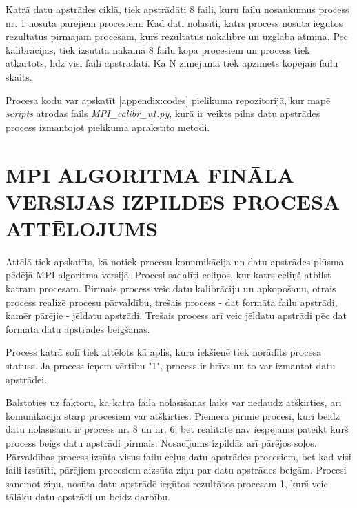\documentclass[12pt,paper=a4]{report}
\newcounter{nofappendices}
\begin{document}
Katrā datu apstrādes ciklā, tiek apstrādāti 8 faili, kuru failu nosaukumus process nr. 1 nosūta pārējiem procesiem. Kad dati nolasīti, katrs process nosūta iegūtos rezultātus pirmajam procesam, kurš rezultātus nokalibrē un uzglabā atmiņā. Pēc kalibrācijas, tiek izsūtīta nākamā 8 failu kopa procesiem un process tiek atkārtots, līdz visi faili apstrādāti. Kā N zīmējumā tiek apzīmēts kopējais failu skaits.

Procesa kodu var apskatīt \ref{appendix:codes} pielikuma repozitorijā, kur mapē \textit{scripts} atrodas fails \textit{MPI\_calibr\_v1.py}, kurā ir veikts pilns datu apstrādes process izmantojot pielikumā aprakstīto metodi.

\begin{figure}[h!]
  \centering
  \begin{turn}{-90}
  \begin{minipage}{\textheight}
  
  \end{minipage}
  \end{turn}
\end{figure}

\addtocounter{nofappendices}{1}
\label{appendix:old-version}

\chapter{MPI ALGORITMA FINĀLA VERSIJAS IZPILDES PROCESA ATTĒLOJUMS}

Attēlā tiek apskatīts, kā notiek procesu komunikācija un datu apstrādes plūsma pēdējā MPI algoritma versijā. Procesi sadalīti celiņos, kur katrs celiņš atbilst katram procesam. Pirmais process veic datu kalibrāciju un apkopošanu, otrais process realizē procesu pārvaldību, trešais process - dat formāta failu apstrādi, kamēr pārējie - jēldatu apstrādi. Trešais process arī veic jēldatu apstrādi pēc dat formāta datu apstrādes beigšanas. 

Process katrā solī tiek attēlots kā aplis, kura iekšienē tiek norādīts procesa statuss. Ja process ieņem vērtību "1", process ir brīvs un to var izmantot datu apstrādei.

Balstoties uz faktoru, ka katra faila nolasīšanas laiks var nedaudz atšķirties, arī komunikācija starp procesiem var atšķirties. Piemērā pirmie procesi, kuri beidz datu nolasīšanu ir process nr. 8 un nr. 6, bet realitātē nav iespējams pateikt kurš process beigs datu apstrādi pirmais. Nosacījums izpildās arī pārējos soļos. Pārvaldības process izsūta visus failu ceļus datu apstrādes procesiem, bet kad visi faili izsūtīti, pārējiem procesiem aizsūta ziņu par datu apstrādes beigām. Procesi saņemot ziņu, nosūta datu apstrādē iegūtos rezultātos procesam 1, kurš veic tālāku datu apstrādi un beidz darbību.
\end{document}
